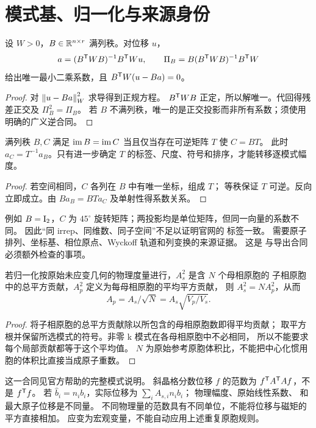 \section{模式基、归一化与来源身份}\label{sec:modes}
\begin{theorem}[带度量的分解与残差]
设 $W>0$，$B\in\mathbb R^{n\times r}$ 满列秩。对位移 $u$，
\[
 a=(B^\mathsf T WB)^{-1}B^\mathsf T Wu,\qquad
 \Pi_B=B(B^\mathsf T WB)^{-1}B^\mathsf T W
\]
给出唯一最小二乘系数，且 $B^\mathsf T W(u-Ba)=0$。
\end{theorem}
\begin{proof}
对 $\left\lVert u-Ba\right\rVert_W^2$ 求导得到正规方程。
$B^\mathsf T WB$ 正定，所以解唯一。代回得残差正交及 $\Pi_B^2=\Pi_B$。
若 $B$ 不满列秩，唯一的是正交投影而非所有系数；须使用明确的广义逆合同。
\end{proof}

\begin{proposition}[子空间相同不等于逐列相同]\label{prop:columns}
满列秩 $B,C$ 满足 $\operatorname{im} B=\operatorname{im} C$ 当且仅当存在可逆矩阵 $T$ 使 $C=BT$。
此时 $a_C=T^{-1}a_B$。只有进一步确定 $T$ 的标签、尺度、符号和排序，才能转移逐模式幅度。
\end{proposition}
\begin{proof}
若空间相同，$C$ 各列在 $B$ 中有唯一坐标，组成 $T$；
等秩保证 $T$ 可逆。反向立即成立。由 $Ba_B=BTa_C$ 及单射性得系数关系。
\end{proof}
例如 $B=\mathrm I_2$，$C$ 为 $45^\circ$ 旋转矩阵；两投影均是单位矩阵，但同一向量的系数不同。
因此“同 irrep、同维数、同子空间”不足以证明官网的  标签一致。
需要原子排列、坐标基、相位原点、Wyckoff 轨道和列变换的来源证据。
这是  与导出合同必须额外检查的事项。

\begin{proposition}[原胞/超胞幅度换算]
若归一化按原始未应变几何的物理度量进行，$A_s^2$ 是含 $N$ 个母相原胞的
子相原胞中的总平方贡献，$A_p^2$ 定义为每母相原胞的平均平方贡献，
则 $A_s^2=N A_p^2$，从而
\[
 A_p=A_s/\sqrt N=A_s\sqrt{V_p/V_s}.
\]
\end{proposition}
\begin{proof}
将子相原胞的总平方贡献除以所包含的母相原胞数即得平均贡献；
取平方根并保留所选模式的符号。非零 k 模式在各母相原胞中不必相同，
所以不能要求每个局部贡献都等于这个平均值。
$N$ 为原始参考原胞体积比，不能把中心化惯用胞的体积比直接当成原子重数。
\end{proof}
这一合同见官方帮助的完整模式说明\citep{OfficialHelp}。
斜晶格分数位移 $f$ 的范数为 $f^\mathsf T A^\mathsf T Af$，不是 $f^\mathsf T f$。
若 $\hat b_i=n_i b_i$，实际位移为 $\sum_i A_{s,i}n_i b_i$；
物理幅度、原始线性系数、 和最大原子位移是不同量。
不同物理量的范数具有不同单位，不能将位移与磁矩的平方直接相加。
应变为宏观变量，不能自动应用上述重复原胞规则。

